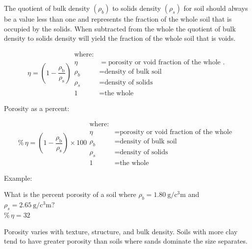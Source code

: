 \documentclass{article}
\begin{document}
The quotient of bulk density $\left(\rho_b\right)$ to solids density $\left(\rho_s\right)$ for soil should always be a value less than one and represents the fraction of the whole soil that is occupied by the solids. When subtracted from the whole the quotient of bulk density to solids density will yield the fraction of the whole soil that is voids.

\begin{equation}
    \eta =\left(1-\frac{\rho_{\text{b}}}{\rho_{\text{s}}}\right)
    \begin{aligned}
        \text{where:}                                            \\
        \eta &= \text{porosity or void fraction of the whole }.  \\
        \rho_b &= \text{density of bulk soil}                    \\
        \rho_s &= \text{density of solids}                       \\
        1 &= \text{the whole}
    \end{aligned}
\end{equation}

Porosity as a percent:

\begin{equation}
    \%\,\eta =\left(1-\frac{\rho_{\text{b}}}{\rho_{\text{s}}}\right) \times 100
    \begin{aligned}
        \text{where:}                                                            \\
        \eta &= \text{porosity or void fraction of the whole }                   \\
        \rho_b &= \text{density of bulk soil}                                    \\
        \rho_s &= \text{density of solids}                                       \\
        1 &= \text{the whole}
    \end{aligned}
\end{equation}

Example:

What is the percent porosity of a soil where $\rho_b = \qty[per-mode = fraction]{1.80}{\gram\per\cubic\centi\meter}$ and $\rho_s = \qty[per-mode = fraction]{2.65}{\gram\per\cubic\centi\meter} ?$ \\
$\%\,\eta = 32$

Porosity varies with texture, structure, and bulk density. Soils with more clay tend to have greater porosity than soils where sands dominate the size separates.
\end{document}
